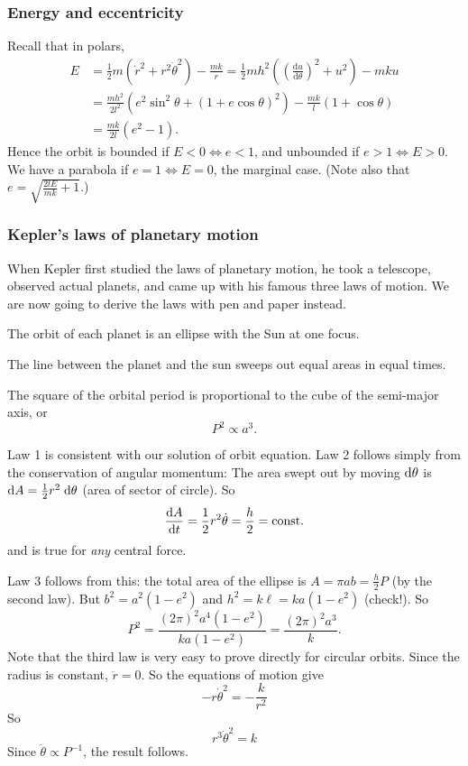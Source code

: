 \subsubsection*{Energy and eccentricity}
Recall that in polars,
\begin{align*}
    E&=\frac{1}{2}m \left( \dot{r}^2+r^2 \dot{\theta}^2 \right) - \frac{mk}{r}=\frac{1}{2}mh^2\left( \left( \frac{\mathrm{d}u}{\mathrm{d}\theta} \right)^2+u^2  \right)-mku\\
    &= \frac{mh^2}{2l^2}\left( e^2 \sin ^2 \theta+(1+e \cos\theta)^2 \right)-\frac{mk}{l}(1+ \cos \theta)\\ 
    &= \frac{mk}{2l}(e^2-1).
\end{align*}
Hence the orbit is bounded if $ E<0 \Leftrightarrow e<1 $, and unbounded if $ e>1 \Leftrightarrow E>0 $. We have a parabola if $ e=1 \Leftrightarrow E=0 $, the marginal case. (Note also that $ e=\sqrt{\frac{2lE}{mk}+1}$.)

\subsubsection*{Kepler's laws of planetary motion}
When Kepler first studied the laws of planetary motion, he took a telescope, observed actual planets, and came up with his famous three laws of motion. We are now going to derive the laws with pen and paper instead.

\begin{law}
  The orbit of each planet is an ellipse with the Sun at one focus.
\end{law}

\begin{law}
  The line between the planet and the sun sweeps out equal areas in equal times.
\end{law}

\begin{law}
  The square of the orbital period is proportional to the cube of the semi-major axis, or
  \[
    P^2 \propto a^3.
  \]
\end{law}

Law 1 is consistent with our solution of orbit equation. Law 2 follows simply from the conservation of angular momentum: The area swept out by moving $\mathrm{d} \theta$ is $\mathrm{d} A = \frac{1}{2}r^2\;\mathrm{d} \theta$ (area of sector of circle). So
\[
  \frac{\mathrm{d} A}{\mathrm{d} t} = \frac{1}{2}r^2\dot{\theta} = \frac{h}{2} = \text{const}.
\]
and is true for \emph{any} central force.

Law 3 follows from this: the total area of the ellipse is $A = \pi ab = \frac{h}{2}P$ (by the second law). But $b^2 = a^2( 1 - e^2)$ and $h^2 = k\ell = ka(1 - e^2)$ (check!). So
\[
  P^2 = \frac{(2\pi)^2a^4(1 - e^2)}{ka(1 - e^2)} = \frac{(2\pi)^2 a^3}{k}.
\]
Note that the third law is very easy to prove directly for circular orbits. Since the radius is constant, $\ddot{r} = 0$. So the equations of motion give
\[
  -r \dot{\theta}^2 = -\frac{k}{r^2}
\]
So
\[
  r^3 \dot{\theta}^2 = k
\]
Since $\dot{\theta}\propto P^{-1}$, the result follows.
